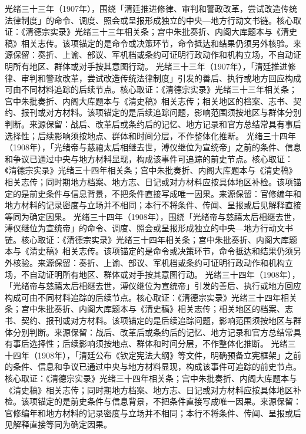 光绪三十三年（1907年），围绕「清廷推进修律、审判和警政改革，尝试改造传统法律制度」的命令、调度、照会或呈报形成独立的中央—地方行动文书链。核心取证：《清德宗实录》光绪三十三年相关条；宫中朱批奏折、内阁大库题本与《清史稿》相关志传。该项锚定的是命令或决策环节，命令抵达和结果仍须另外核验。来源保留：奏折、上谕、部议、军机档或条约可证明行政动作和机构立场，不自动证明所有地区、群体或对手按其意图行动。
光绪三十三年（1907年），「清廷推进修律、审判和警政改革，尝试改造传统法律制度」引发的善后、执行或地方回应构成可由不同材料追踪的后续节点。核心取证：《清德宗实录》光绪三十三年相关条；宫中朱批奏折、内阁大库题本与《清史稿》相关志传；相关地区的档案、志书、契约、报刊或对方材料。该项锚定的是后续追踪问题，影响范围须按地区与群体分别判断。来源保留：战后、改革后或条约后的记忆、地方记录和官方总结常具有事后选择性；后续影响须按地点、群体和时间分层，不作整体化推断。
光绪三十四年（1908年），「光绪帝与慈禧太后相继去世，溥仪继位为宣统帝」之前的条件、信息和争议已通过中央与地方材料显现，构成该事件可追踪的前史节点。核心取证：《清德宗实录》光绪三十四年相关条；宫中朱批奏折、内阁大库题本与《清史稿》相关志传；同时期地方档案、地方志、日记或对方材料应按具体地区补检。该项锚定的是前史条件与信息背景，不把条件直接写成唯一因果。来源保留：官修编年和地方材料的记录密度与立场并不相同；本行不将条件、传闻、呈报或后见解释直接等同为确定因果。
光绪三十四年（1908年），围绕「光绪帝与慈禧太后相继去世，溥仪继位为宣统帝」的命令、调度、照会或呈报形成独立的中央—地方行动文书链。核心取证：《清德宗实录》光绪三十四年相关条；宫中朱批奏折、内阁大库题本与《清史稿》相关志传。该项锚定的是命令或决策环节，命令抵达和结果仍须另外核验。来源保留：奏折、上谕、部议、军机档或条约可证明行政动作和机构立场，不自动证明所有地区、群体或对手按其意图行动。
光绪三十四年（1908年），「光绪帝与慈禧太后相继去世，溥仪继位为宣统帝」引发的善后、执行或地方回应构成可由不同材料追踪的后续节点。核心取证：《清德宗实录》光绪三十四年相关条；宫中朱批奏折、内阁大库题本与《清史稿》相关志传；相关地区的档案、志书、契约、报刊或对方材料。该项锚定的是后续追踪问题，影响范围须按地区与群体分别判断。来源保留：战后、改革后或条约后的记忆、地方记录和官方总结常具有事后选择性；后续影响须按地点、群体和时间分层，不作整体化推断。
光绪三十四年（1908年），「清廷公布《钦定宪法大纲》等文件，明确预备立宪框架」之前的条件、信息和争议已通过中央与地方材料显现，构成该事件可追踪的前史节点。核心取证：《清德宗实录》光绪三十四年相关条；宫中朱批奏折、内阁大库题本与《清史稿》相关志传；同时期地方档案、地方志、日记或对方材料应按具体地区补检。该项锚定的是前史条件与信息背景，不把条件直接写成唯一因果。来源保留：官修编年和地方材料的记录密度与立场并不相同；本行不将条件、传闻、呈报或后见解释直接等同为确定因果。
